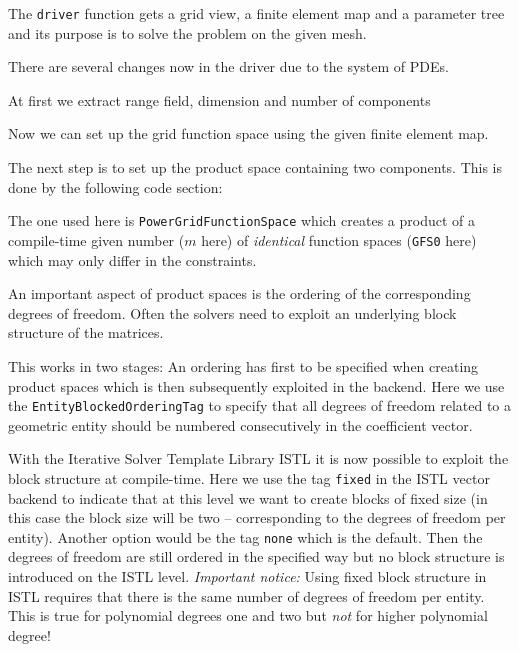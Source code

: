 \documentclass[a4paper,12pt]{article}
\theoremstyle{definition}
\theoremstyle{definition}
\begin{document}
The \lstinline{driver} function gets a grid view, a finite element
map and a parameter tree and its purpose is to solve the problem on
the given mesh.

There are several changes now in the driver due to the system of PDEs.

At first we extract range field, dimension and number of components









Now we can set up the grid function space using the given finite
element map.

The next step is to set up the product space containing
two components. This is done by the following code section:

 The one used here is \lstinline{PowerGridFunctionSpace} which creates
a product of a compile-time given number ($m$ here)
of \textit{identical} function spaces (\lstinline{GFS0} here)
which may only differ in the constraints. 

% 


An important aspect of product spaces is the ordering of the corresponding degrees
of freedom. Often the solvers need to exploit an underlying block structure
of the matrices.

This works in two stages: An ordering has first to be specified when creating product spaces
which is then subsequently exploited in the backend.
Here we use the \lstinline{EntityBlockedOrderingTag} to specify that all degrees of
freedom related to a geometric entity should be numbered consecutively in
the coefficient vector.

With the Iterative Solver Template Library ISTL it is now
possible to exploit the block structure at compile-time.
Here we use the tag \lstinline{fixed} in the ISTL vector backend to indicate
that at this level we want to create blocks of fixed size (in this case the block size will be two --
corresponding to the degrees of freedom per entity). Another option
would be the tag \lstinline{none} which is the default. Then the degrees
of freedom are still ordered in the specified way but no block structure is
introduced on the ISTL level. \textit{Important notice:} Using fixed block
structure in ISTL requires that there is the same number of degrees of freedom
per entity. This is true for polynomial degrees one and two but \textit{not}
for higher polynomial degree!
\end{document}
